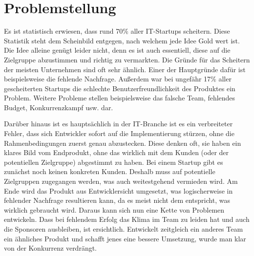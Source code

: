 \section{Problemstellung}
Es ist statistisch erwiesen, dass rund 70\% aller IT-Startups scheitern. \citep{CBInsights_failure} Diese Statistik steht dem Scheinbild entgegen, nach welchem jede Idee Gold wert ist. Die Idee alleine genügt leider nicht, denn es ist auch essentiell, diese auf die Zielgruppe abzustimmen und richtig zu vermarkten. Die Gründe für das Scheitern der meisten Unternehmen sind oft sehr ähnlich. Einer der Hauptgründe dafür ist beispielsweise die fehlende Nachfrage. Außerdem war bei ungefähr 17\% aller gescheiterten Startups die schlechte Benutzerfreundlichkeit des Produktes ein Problem. Weitere Probleme stellen beispielsweise das falsche Team, fehlendes Budget, Konkurrenzkampf usw. dar. \citep{CBInsights_reasons}

Darüber hinaus ist es hauptsächlich in der IT-Branche ist es ein verbreiteter Fehler, dass sich Entwickler sofort auf die Implementierung stürzen, ohne die Rahmenbedingungen zuerst genau abzustecken. Diese denken oft, sie haben ein klares Bild vom Endprodukt, ohne das wirklich mit dem Kunden (oder der potentiellen Zielgruppe) abgestimmt zu haben. Bei einem Startup gibt es zunächst noch keinen konkreten Kunden. Deshalb muss auf potentielle Zielgruppen zugegangen werden, was auch weitestgehend vermieden wird. Am Ende wird das Produkt aus Entwicklersicht umgesetzt, was logischerweise in fehlender Nachfrage resultieren kann, da es meist nicht dem entspricht, was wirklich gebraucht wird. Daraus kann sich nun eine Kette von Problemen entwickeln. Dass bei fehlendem Erfolg das Klima im Team zu leiden hat und auch die Sponsoren ausbleiben, ist ersichtlich. Entwickelt zeitgleich ein anderes Team ein ähnliches Produkt und schafft jenes eine bessere Umsetzung, wurde man klar von der Konkurrenz verdrängt.


